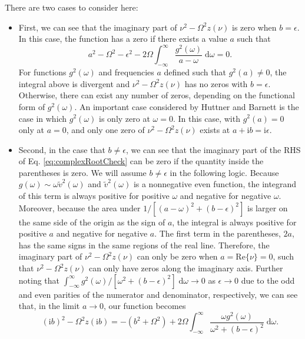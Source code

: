 \documentclass{article}
\begin{document}
There are two cases to consider here:
\begin{itemize}
    \item{
    First, we can see that the imaginary part of $\nu^2 - \Omega^2z(\nu)$ is zero when $b = \epsilon$. In this case, the function has a zero if there exists a value $a$ such that
    \begin{equation}
    a^2 - \Omega^2 - \epsilon^2 - 2\Omega\int_{-\infty}^\infty\frac{g^2(\omega)}{a - \omega}\;\mathrm{d}\omega = 0.
    \end{equation}
    For functions $g^2(\omega)$ and frequencies $a$ defined such that $g^2(a)\neq0$, the integral above is divergent and $\nu^2 - \Omega^2z(\nu)$ has no zeros with $b = \epsilon$. Otherwise, there can exist any number of zeros, depending on the functional form of $g^2(\omega)$. An important case considered by Huttner and Barnett\cite{huttner1992quantization} is the case in which $g^2(\omega)$ is only zero at $\omega = 0$. In this case, with $g^2(a) = 0$ only at $a = 0$, and only one zero of $\nu^2 - \Omega^2z(\nu)$ exists at $a + \mathrm{i}b = \mathrm{i}\epsilon$.
    }
    \item{
    Second, in the case that $b\neq\epsilon$, we can see that the imaginary part of the RHS of Eq. \eqref{eq:complexRootCheck} can be zero if the quantity inside the parentheses is zero. We will assume $b\neq\epsilon$ in the following logic. Because $g(\omega)\sim\omega\tilde{v}^2(\omega)$ and $\tilde{v}^2(\omega)$ is a nonnegative even function, the integrand of this term is always positive for positive $\omega$ and negative for negative $\omega$. Moreover, because the area under $1/[(a - \omega)^2 + (b - \epsilon)^2]$ is larger on the same side of the origin as the sign of $a$, the integral is always positive for positive $a$ and negative for negative $a$. The first term in the parentheses, $2a$, has the same signs in the same regions of the real line. Therefore, the imaginary part of $\nu^2 - \Omega^2z(\nu)$ can only be zero when $a = \mathrm{Re}\{\nu\} = 0$, such that $\nu^2 - \Omega^2z(\nu)$ can only have zeros along the imaginary axis. Further noting that $\int_{-\infty}^\infty g^2(\omega)/[\omega^2 + (b - \epsilon)^2]\;\mathrm{d}\omega \to 0$ as $\epsilon\to0$ due to the odd and even parities of the numerator and denominator, respectively, we can see that, in the limit $a\to0$, our function becomes
    \begin{equation}
    (\mathrm{i}b)^2 - \Omega^2z(\mathrm{i}b) = -(b^2 + \Omega^2) + 2\Omega\int_{-\infty}^\infty \frac{\omega g^2(\omega)}{\omega^2 + (b - \epsilon)^2}\;\mathrm{d}\omega.

\end{equation}}
\end{itemize}
\end{document}
